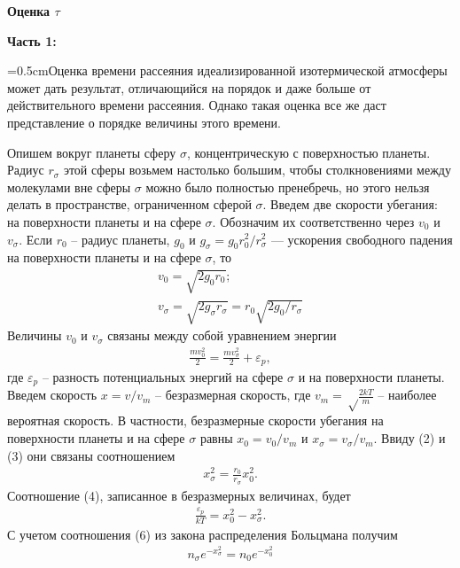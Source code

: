 \documentclass{letask}
\begin{document}
\newpage
	\begin{center}
		\textbf{\Large{Оценка $\tau$}}
	\end{center}
	
\textbf{Часть 1:}

\parindent=0.5cmОценка времени рассеяния идеализированной изотермической атмосферы может дать результат, отличающийся на порядок и даже больше от действительного времени рассеяния. Однако такая оценка все же даст представление о порядке величины этого времени.

\parindent=0.5cm Опишем вокруг планеты сферу $\sigma$, концентрическую с поверхностью планеты. Радиус $r_{\sigma}$ этой сферы возьмем настолько большим, чтобы столкновениями между молекулами вне сферы $\sigma$ можно было полностью пренебречь, но этого нельзя делать в пространстве, ограниченном сферой $\sigma$. Введем две скорости убегания: на поверхности планеты и на сфере $\sigma$. Обозначим их соответственно через $v_0$ и $v_{\sigma}$. Если $r_0$ -- радиус планеты, $g_0$ и $g_{\sigma} = g_0 r^2_0/r^2_{\sigma}$ — ускорения свободного падения на поверхности планеты и на сфере $\sigma$, то 
		\begin{gather}
			v_0 = \sqrt{2g_0r_0}; \\
			v_{\sigma} = \sqrt{2g_\sigma r_\sigma} = r_0 \sqrt{2g_0/r_\sigma}
		\end{gather}
Величины $v_0$ и $v_\sigma$ связаны между собой уравнением энергии
	\begin{gather}
	\frac{mv^2_0}{2} = \frac{mv^2_\sigma}{2} + \varepsilon_p,
	\end{gather}
где $\varepsilon_p$ -- разность потенциальных энергий на сфере $\sigma$ и на поверхности планеты. Введем скорость $x = v/v_m$ -- безразмерная скорость, где $v_m = \sqrt \frac{2kT}{m}$ -- наиболее вероятная скорость. В частности, безразмерные скорости убегания на поверхности планеты и на сфере $\sigma$ равны $x_0 = v_0/v_m$ и $x_\sigma = v_\sigma/v_m$. Ввиду (2) и (3) они связаны соотношением 
	\begin{gather}
	x^2_\sigma = \frac{r_0}{r_\sigma}x^2_0.
	\end{gather}
Соотношение (4), записанное в безразмерных величинах, будет 
	\begin{gather}
	\frac{\varepsilon_p}{kT} = x^2_0 - x^2_\sigma.
	\end{gather}
С учетом соотношения (6) из закона распределения Больцмана получим 
	\begin{gather}
	n_\sigma e^{-x^2_\sigma} = n_0 e^{-x^2_0}
	\end{gather}
\end{document}

